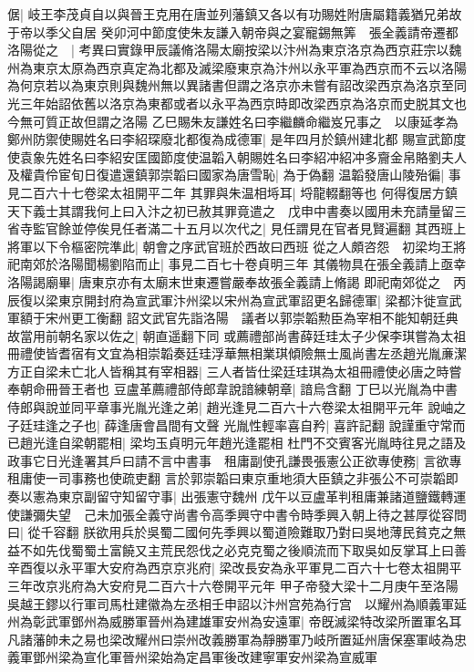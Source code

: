 倨|{
	岐王李茂貞自以與晉王克用在唐並列藩鎮又各以有功賜姓附唐屬籍義猶兄弟故于帝以季父自居}
癸卯河中節度使朱友謙入朝帝與之宴寵錫無筭　張全義請帝遷都洛陽從之　|{
	考異曰實錄甲辰議脩洛陽太廟按梁以汴州為東京洛京為西京莊宗以魏州為東京太原為西京真定為北都及滅梁廢東京為汴州以永平軍為西京而不云以洛陽為何京若以為東京則與魏州無以異諸書但謂之洛京亦未嘗有詔改梁西京為洛京至同光三年始詔依舊以洛京為東都或者以永平為西京時即改梁西京為洛京而史脱其文也今無可質正故但謂之洛陽}
乙巳賜朱友謙姓名曰李繼麟命繼岌兄事之　以康延孝為鄭州防禦使賜姓名曰李紹琛廢北都復為成德軍|{
	是年四月於鎮州建北都}
賜宣武節度使袁象先姓名曰李紹安匡國節度使温韜入朝賜姓名曰李紹冲紹冲多齎金帛賂劉夫人及權貴伶宦旬日復遣還鎮郭崇韜曰國家為唐雪恥|{
	為于偽翻}
温韜發唐山陵殆徧|{
	事見二百六十七卷梁太祖開平二年}
其罪與朱温相埓耳|{
	埒龍輟翻等也}
何得復居方鎮天下義士其謂我何上曰入汴之初已赦其罪竟遣之　戊申中書奏以國用未充請量留三省寺監官餘並停俟見任者滿二十五月以次代之|{
	見任謂見在官者見賢遍翻}
其西班上將軍以下令樞密院準此|{
	朝會之序武官班於西故曰西班}
從之人頗咨怨　初梁均王將祀南郊於洛陽聞楊劉陷而止|{
	事見二百七十卷貞明三年}
其儀物具在張全義請上亟幸洛陽謁廟畢|{
	唐東京亦有太廟末世東遷嘗嚴奉故張全義請上脩謁}
即祀南郊從之　丙辰復以梁東京開封府為宣武軍汴州梁以宋州為宣武軍詔更名歸德軍|{
	梁都汴徙宣武軍額于宋州更工衡翻}
詔文武官先詣洛陽　議者以郭崇韜勲臣為宰相不能知朝廷典故當用前朝名家以佐之|{
	朝直遥翻下同}
或薦禮部尚書薛廷珪太子少保李琪嘗為太祖冊禮使皆耆宿有文宜為相崇韜奏廷珪浮華無相業琪傾險無士風尚書左丞趙光胤亷潔方正自梁未亡北人皆稱其有宰相器|{
	三人者皆仕梁廷珪琪為太祖冊禮使必唐之時嘗奉朝命冊晉王者也}
豆盧革薦禮部侍郎韋說諳練朝章|{
	諳烏含翻}
丁巳以光胤為中書侍郎與說並同平章事光胤光逢之弟|{
	趙光逢見二百六十六卷梁太祖開平元年}
說岫之子廷珪逢之子也|{
	薛逢唐會昌間有文聲}
光胤性輕率喜自矜|{
	喜許記翻}
說謹重守常而已趙光逢自梁朝罷相|{
	梁均玉貞明元年趙光逢罷相}
杜門不交賓客光胤時往見之語及政事它日光逢署其戶曰請不言中書事　租庸副使孔謙畏張憲公正欲專使務|{
	言欲專租庸使一司事務也使疏吏翻}
言於郭崇韜曰東京重地須大臣鎮之非張公不可崇韜即奏以憲為東京副留守知留守事|{
	出張憲守魏州}
戊午以豆盧革判租庸兼諸道鹽鐵轉運使謙彌失望　己未加張全義守尚書令高季興守中書令時季興入朝上待之甚厚從容問曰|{
	從千容翻}
朕欲用兵於吳蜀二國何先季興以蜀道險難取乃對曰吳地薄民貧克之無益不如先伐蜀蜀土富饒又主荒民怨伐之必克克蜀之後順流而下取吳如反掌耳上曰善　辛酉復以永平軍大安府為西京京兆府|{
	梁改長安為永平軍見二百六十七卷太祖開平三年改京兆府為大安府見二百六十六卷開平元年}
甲子帝發大梁十二月庚午至洛陽　吳越王鏐以行軍司馬杜建徽為左丞相壬申詔以汴州宫苑為行宫　以耀州為順義軍延州為彰武軍鄧州為威勝軍晉州為建雄軍安州為安遠軍|{
	帝旣滅梁特改梁所置軍名耳凡諸藩帥未之易也梁改耀州曰崇州改義勝軍為靜勝軍乃岐所置延州唐保塞軍岐為忠義軍鄧州梁為宣化軍晉州梁始為定昌軍後改建寧軍安州梁為宣威軍}
